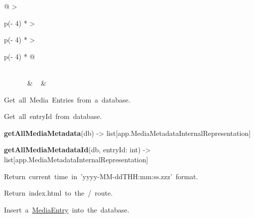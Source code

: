 \begin{longtable}[]{@{}
  >{\raggedright\arraybackslash}p{(\columnwidth - 4\tabcolsep) * }
  >{\raggedright\arraybackslash}p{(\columnwidth - 4\tabcolsep) * }
  >{\raggedright\arraybackslash}p{(\columnwidth - 4\tabcolsep) * }@{}}
\toprule
\endhead
{} \\
{~~~~~~} & ~ & \begin{minipage}[t]{\linewidth}\raggedright
\begin{description}
\tightlist
\item[\protect\hypertarget{-getAllMediaEntry}{}{\textbf{getAllMediaEntry}}(db)
-\textgreater{} list{[}app.MediaEntryInternalRepresentation{]}]
{Get~all~Media~Entries~from~a~database.}
\end{description}

\begin{description}
\tightlist
\item[\protect\hypertarget{-getAllMediaEntryIDs}{}{\textbf{getAllMediaEntryIDs}}(db)]
{Get~all~entryId~from~database.}
\end{description}

\protect\hypertarget{-getAllMediaMetadata}{}{\textbf{getAllMediaMetadata}}(db)
-\textgreater{} list{[}app.MediaMetadataInternalRepresentation{]}

\protect\hypertarget{-getAllMediaMetadataId}{}{\textbf{getAllMediaMetadataId}}(db,
entryId: int) -\textgreater{}
list{[}app.MediaMetadataInternalRepresentation{]}

\begin{description}
\tightlist
\item[\protect\hypertarget{-getCurrentTime}{}{\textbf{getCurrentTime}}()
-\textgreater{} str]
{Return~current~time~in~'yyyy-MM-ddTHH:mm:ss.zzz'~format.}
\end{description}

\begin{description}
\tightlist
\item[\protect\hypertarget{-index}{}{\textbf{index}}()]
{Return~index.html~to~the~/~route.}
\end{description}

\begin{description}
\tightlist
\item[\protect\hypertarget{-insertMediaEntry}{}{\textbf{insertMediaEntry}}(db,
shotType, illuminationType, iso, apertureSize, shutterSpeed,
whiteBalance)]
{Insert~a~\protect\hyperlink{MediaEntry}{MediaEntry}~into~the~database.}
\end{description}


\end{minipage}
\end{longtable}

